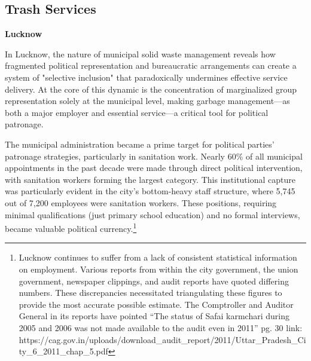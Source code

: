 \subsection{Trash Services}

\vspace{5mm}
\textbf{Lucknow} 

In Lucknow, the nature of municipal solid waste management reveals how fragmented political representation and bureaucratic arrangements can create a system of "selective inclusion" that paradoxically undermines effective service delivery. At the core of this dynamic is the concentration of marginalized group representation solely at the municipal level, making garbage management—as both a major employer and essential service—a critical tool for political patronage.

The municipal administration became a prime target for political parties' patronage strategies, particularly in sanitation work. Nearly 60\% of all municipal appointments in the past decade were made through direct political intervention, with sanitation workers forming the largest category. This institutional capture was particularly evident in the city's bottom-heavy staff structure, where 5,745 out of 7,200 employees were sanitation workers. These positions, requiring minimal qualifications (just primary school education) and no formal interviews, became valuable political currency.\footnote{Lucknow continues to suffer from a lack of consistent statistical information on employment. Various reports from within the city government, the union government, newspaper clippings, and audit reports have quoted differing numbers. These discrepancies necessitated triangulating these figures to provide the most accurate possible estimate.
The Comptroller and Auditor General in its reports have pointed “The status of Safai karmchari during 2005 and 2006 was not made available to the audit even in 2011” pg. 30 link: https://cag.gov.in/uploads/download_audit_report/2011/Uttar_Pradesh_City_6_2011_chap_5.pdf 
}


